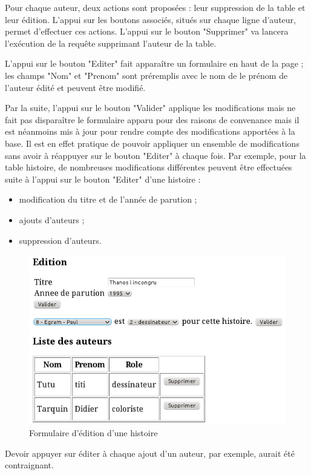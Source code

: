 \documentclass[12pt]{article}
\begin{document}
Pour chaque auteur, deux actions sont proposées : leur suppression de la table
et leur édition. L'appui sur les boutons associés, situés sur chaque ligne
d'auteur, permet d'effectuer ces actions. L'appui sur le bouton "Supprimer" va
lancera l'exécution de la requête supprimant l'auteur de la table.

L'appui sur le bouton "Editer" fait apparaître un formulaire en haut de la
page ; les champs "Nom" et "Prenom" sont préremplis avec le nom de le prénom
de l'auteur édité et peuvent être modifié.

Par la suite, l'appui sur le bouton "Valider" applique les modifications mais
ne fait pas disparaître le formulaire apparu pour des raisons de convenance
mais il est néanmoins mis à jour pour rendre compte des modifications
apportées à la base.
Il est en effet pratique de pouvoir appliquer un ensemble de modifications
sans avoir à réappuyer sur le bouton "Editer" à chaque fois.
Par exemple, pour la table histoire, de nombreuses modifications différentes
peuvent être effectuées suite à l'appui sur le bouton "Editer" d'une histoire
: 
\begin{itemize}
	\item modification du titre et de l'année de parution ;
	\item ajouts d'auteurs ;
	\item suppression d'auteurs.
\end{itemize}

\begin{figure}[h!]
\begin{center}
\noindent\includegraphics[]{formulaire-edition-histoire}
  \caption{Formulaire d'édition d'une histoire}
\end{center}
\end{figure}

Devoir appuyer sur éditer à chaque ajout d'un auteur, par exemple, aurait été
contraignant.
\end{document}
